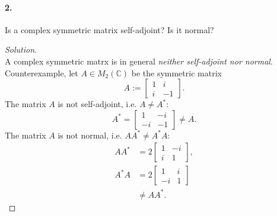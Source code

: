 \documentclass{article}
\theoremstyle{plain}
\theoremstyle{definition}
\theoremstyle{remark}
\newcommand{\co}{\mathbb{C}}
\begin{document}
    \paragraph{2.}
    Is a complex symmetric matrix self-adjoint? Is it normal?
      \begin{proof}[Solution]$ $\\
        A complex symmetric matrx is in general \textit{neither self-adjoint nor normal}. Counterexample, let $A\in M_{2}(\co)$ be the symmetric matrix
        $$A:= \begin{bmatrix}
                1 & i\\
                i & -1
              \end{bmatrix}.$$
        The matrix $A$ is not self-adjoint, i.e. $A\neq A^*$:
        $$A^*= \begin{bmatrix}
                            1 & -i\\
                            -i & -1
                          \end{bmatrix} \neq A. $$
        The matrix $A$ is not normal, i.e. $AA^* \neq A^*A$:
        \begin{align}
          AA^* & =           2\begin{bmatrix}
                              1 & -i\\
                              i &  1
                            \end{bmatrix},\\
          A^*A & =          2\begin{bmatrix}
                              1  &  i\\
                              -i &  1
                            \end{bmatrix}\\
              & \neq AA^*.
        \end{align}
      \end{proof}
\end{document}
